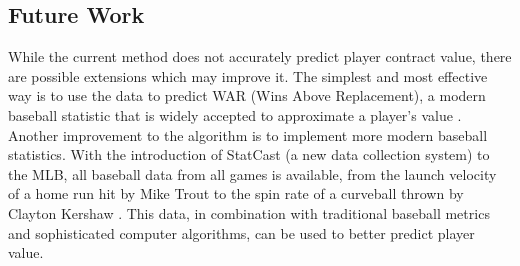 \documentclass[12pt, letterpaper]{article}
\begin{document}
\subsection{Future Work}
While the current method does not accurately predict player contract value, there are possible extensions which may improve it. The simplest and most effective way is to use the data to predict WAR (Wins Above Replacement), a modern baseball statistic that is widely accepted to approximate a player's value \cite{fangraphs-war}. Another improvement to the algorithm is to implement more modern baseball statistics. With the introduction of StatCast (a new data collection system) to the MLB, all baseball data from all games is available, from the launch velocity of a home run hit by Mike Trout \cite{baseball-savant-trout} to the spin rate of a curveball thrown by Clayton Kershaw \cite{baseball-savant-kershaw}. This data, in combination with traditional baseball metrics and sophisticated computer algorithms, can be used to better predict player value.



\end{document}
